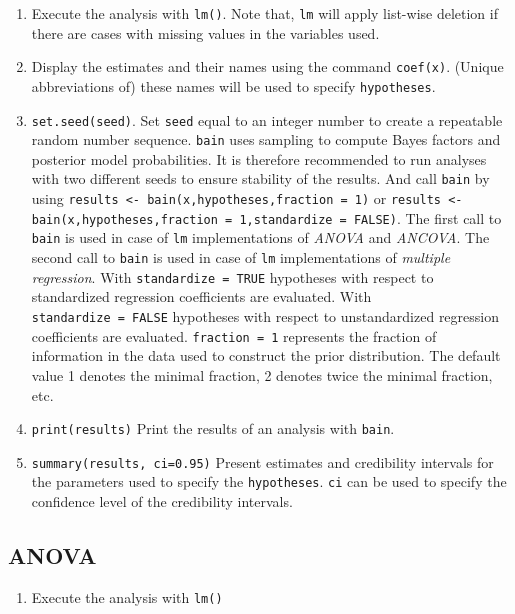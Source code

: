 \documentclass[
]{book}
\providecommand{\tightlist}{%
  \setlength{\itemsep}{0pt}\setlength{\parskip}{0pt}}
\begin{document}
\begin{enumerate}
\def\labelenumi{\arabic{enumi})}
\item
  Execute the analysis with \texttt{lm()}. Note that, \texttt{lm} will apply list-wise deletion if there are cases with missing values in the variables used.
\item
  Display the estimates and their names using the command \texttt{coef(x)}. (Unique abbreviations of) these names will be used to specify \texttt{hypotheses}.
\item
  \texttt{set.seed(seed)}. Set \texttt{seed} equal to an integer
  number to create a repeatable random number sequence. \texttt{bain} uses sampling to compute Bayes factors and posterior model probabilities. It is therefore recommended to run analyses with two different seeds to ensure stability of the results.
  And call \texttt{bain} by using \texttt{results\ \textless{}-\ bain(x,hypotheses,fraction\ =\ 1)} or
  \texttt{results\ \textless{}-bain(x,hypotheses,fraction\ =\ 1,standardize\ =\ FALSE)}. The first call to
  \texttt{bain} is used in case of \texttt{lm} implementations of \emph{ANOVA} and \emph{ANCOVA}. The
  second call to \texttt{bain} is used in case of \texttt{lm} implementations of
  \emph{multiple regression}. With \texttt{standardize\ =\ TRUE} hypotheses with respect
  to standardized regression coefficients are evaluated. With \texttt{standardize\ =\ FALSE} hypotheses with respect to unstandardized regression coefficients
  are evaluated. \texttt{fraction\ =\ 1} represents the fraction of information in the data used to construct the prior distribution. The default value 1 denotes the minimal fraction, 2 denotes twice the minimal fraction, etc.
\item
  \texttt{print(results)} Print the results of an analysis with
  \texttt{bain}.
\item
  \texttt{summary(results,\ ci=0.95)} Present estimates and credibility intervals for the parameters used to specify the \texttt{hypotheses}. \texttt{ci} can be used to specify the confidence level of the credibility intervals.
\end{enumerate}

\hypertarget{anova}{%
\subsection{ANOVA}\label{anova}}

\begin{enumerate}
\def\labelenumi{\arabic{enumi})}
\tightlist
\item
  Execute the analysis with \texttt{lm()}
\end{enumerate}
\end{document}
